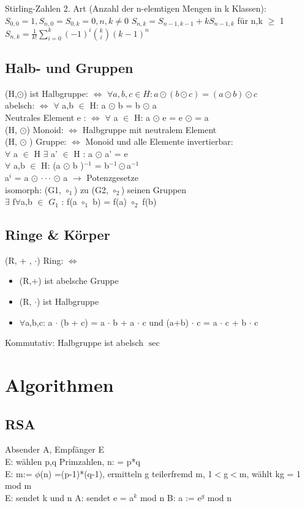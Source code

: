 \documentclass[]{article}
\begin{document}
Stirling-Zahlen 2. Art (Anzahl der n-elemtigen Mengen in k Klassen): 
$S_{0,0}=1 , S_{n,0}=S_{0,k}=0, n,k \neq 0$
$S_{n,k} = S_{n-1,k-1} + kS_{n-1,k}  $ f\"ur n,k $\geq$ 1 
$S_{n,k}= \frac{1}{k!} \sum_{i=0}^k (-1)^i \binom{k}{i} (k-1)^n$

\subsection{Halb- und Gruppen}
(H,$\odot$) ist Halbgruppe: $\Leftrightarrow$ $\forall a,b,c \in H: a \odot (b \odot c) = (a \odot b) \odot c $ \\
abelsch: $\Leftrightarrow$ $\forall$ a,b $\in$ H: a $\odot$ b = b $\odot$ a \\
Neutrales Element e :  $\Leftrightarrow$ $\forall$ a $\in$ H: a $\odot$ e = e $\odot$ = a \\
(H, $\odot$) Monoid: $\Leftrightarrow$ Halbgruppe mit neutralem Element \\
(H, $\odot$ ) Gruppe: $\Leftrightarrow$ Monoid und alle Elemente invertierbar:\\ $\forall$ a $\in$ H $\exists$ a' $\in$ H : a $\odot$ a' = e  \\
$\forall$ a,b $\in$ H: 
(a $\odot$ b )$^{-1}$ = b$^{-1} \odot $a$^{-1}$\\
a$^i$ = a $\odot$ $\cdot \cdot \cdot$ $\odot$ a $\rightarrow$ Potenzgesetze \\
isomorph: (G1, $\circ_1$) zu (G2, $\circ_2$) seinen Gruppen\\
$\exists$ f$\forall$a,b $\in$ $G_1$ : f(a $\circ_1$ b) = f(a) $\circ_2$ f(b)  

\subsection{Ringe \& Körper}
(R, + , $\cdot$) Ring: $\Leftrightarrow$ 
\begin{itemize}
	 \item (R,+) ist abelsche Gruppe
	 \item (R, $\cdot$) ist Halbgruppe
	 \item $\forall$a,b,c: a $\cdot$ (b + c) = a $\cdot$ b + a $\cdot$ c und (a+b) $\cdot$ c = a $\cdot$ c + b $\cdot$ c 
\end{itemize}
Kommutativ: Halbgruppe ist abelsch
$\sec$
\section{Algorithmen}
\subsection{RSA}
Absender A, Empfänger E \\
E: wählen p,q Primzahlen, n: = p*q \\
E: m:= $\phi$(n) =(p-1)*(q-1), ermitteln g teilerfremd m, 1$<$g$<$m, wählt kg = 1 mod m \\
E: sendet k und n
A: sendet e = a$^k$ mod n
B: a := e$^g$ mod n 
\end{document}
